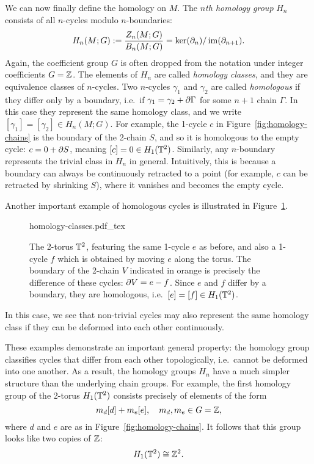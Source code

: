 We can now finally define the homology on $M$. The \emph{$n$th homology group} $H_n$ consists of all $n$-cycles modulo $n$-boundaries:
\begin{equation*}
	H_n(M;G) := \frac{Z_n(M;G)}{B_n(M;G)} = \ker(\partial_n) / \operatorname{im}(\partial_{n+1}).
\end{equation*}
Again, the coefficient group $G$ is often dropped from the notation under integer coefficients $G=\mathbb{Z}$. The elements of $H_n$ are called \emph{homology classes}, and they are equivalence classes of $n$-cycles. Two $n$-cycles $\gamma_1$ and $\gamma_2$ are called \emph{homologous} if they differ only by a boundary, i.e.\ if $\gamma_1 = \gamma_2 + \partial\Gamma$ for some $n+1$ chain $\Gamma$. In this case they represent the same homology class, and we write $[\gamma_1] = [\gamma_2]\in H_n(M;G)$. For example, the 1-cycle $c$ in Figure~\ref{fig:homology-chains} is the boundary of the 2-chain $S$, and so it is homologous to the empty cycle: $c= 0 + \partial S$, meaning $[c] = 0\in H_1(\mathbb{T}^2)$. Similarly, any $n$-boundary represents the trivial class in $H_n$ in general. Intuitively, this is because a boundary can always be continuously retracted to a point (for example, $c$ can be retracted by shrinking $S$), where it vanishes and becomes the empty cycle.

Another important example of homologous cycles is illustrated in Figure~\ref{fig:homology-classes}.
\begin{figure}[htb!]
	\centering
	\def\svgwidth{.6\linewidth}
	{homology-classes.pdf_tex}
	\caption{The 2-torus $\mathbb{T}^2$, featuring the same 1-cycle $e$ as before, and also a 1-cycle $f$ which is obtained by moving $e$ along the torus. The boundary of the 2-chain $V$ indicated in orange is precisely the difference of these cycles: $\partial V = e - f$. Since $e$ and $f$ differ by a boundary, they are homologous, i.e.\ $[e]=[f]\in H_1(\mathbb{T}^2)$.}
	\label{fig:homology-classes}
\end{figure}
In this case, we see that non-trivial cycles may also represent the same homology class if they can be deformed into each other continuously.

These examples demonstrate an important general property: the homology group classifies cycles that differ from each other topologically, i.e.\ cannot be deformed into one another. As a result, the homology groups $H_n$ have a much simpler structure than the underlying chain groups. For example, the first homology group of the 2-torus $H_1(\mathbb{T}^2)$ consists precisely of elements of the form
\begin{equation*}
	m_d[d] + m_e[e],\quad m_d,m_e\in G=\mathbb{Z},
\end{equation*}
where $d$ and $e$ are as in Figure~\ref{fig:homology-chains}. It follows that this group looks like two copies of $\mathbb{Z}$:
\begin{equation*}
	H_1(\mathbb{T}^2) \cong \mathbb{Z}^2.
\end{equation*}

